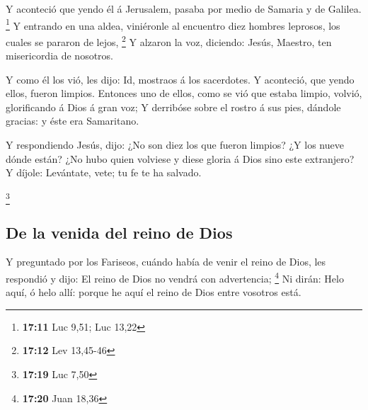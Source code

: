  Y aconteció que yendo él á Jerusalem, pasaba por medio de
Samaria y de Galilea. \footnote{\textbf{17:11} Luc 9,51; Luc 13,22}
 Y entrando en una aldea, viniéronle al encuentro diez
hombres leprosos, los cuales se pararon de lejos, \footnote{\textbf{17:12}
  Lev 13,45-46}  Y alzaron la voz, diciendo: Jesús,
Maestro, ten misericordia de nosotros.

 Y como él los vió, les dijo: Id, mostraos á los
sacerdotes. Y aconteció, que yendo ellos, fueron limpios. 
Entonces uno de ellos, como se vió que estaba limpio, volvió,
glorificando á Dios á gran voz;  Y derribóse sobre el
rostro á sus pies, dándole gracias: y éste era Samaritano.

 Y respondiendo Jesús, dijo: ¿No son diez los que fueron
limpios? ¿Y los nueve dónde están?  ¿No hubo quien volviese
y diese gloria á Dios sino este extranjero?  Y díjole:
Levántate, vete; tu fe te ha salvado.

\footnote{\textbf{17:19} Luc 7,50}

\hypertarget{de-la-venida-del-reino-de-dios}{%
\subsection{De la venida del reino de
Dios}\label{de-la-venida-del-reino-de-dios}}

 Y preguntado por los Fariseos, cuándo había de venir el
reino de Dios, les respondió y dijo: El reino de Dios no vendrá con
advertencia; \footnote{\textbf{17:20} Juan 18,36}  Ni
dirán: Helo aquí, ó helo allí: porque he aquí el reino de Dios entre
vosotros está.

